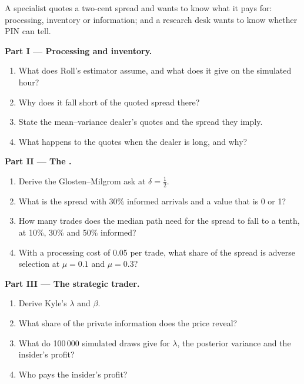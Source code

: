 \begin{problem}\label{pb:mx:why-there-is-a-spread:1}
A specialist quotes a two-cent spread and wants to know what it pays for: processing, inventory or information; and a research desk wants to know whether
PIN can tell.

\medskip\noindent\textbf{Part I --- Processing and inventory.}
\begin{enumerate}
\item What does Roll's estimator assume, and what does it give on the simulated hour?
\item Why does it fall short of the quoted spread there?
\item State the mean--variance dealer's quotes and the spread they imply.
\item What happens to the quotes when the dealer is long, and why?
\end{enumerate}

\medskip\noindent\textbf{Part II --- The .}
\begin{enumerate}[resume]
\item Derive the Glosten--Milgrom ask at $\delta=\tfrac12$.
\item What is the spread with 30\% informed arrivals and a value that is 0 or 1?
\item How many trades does the median path need for the spread to fall to a tenth, at 10\%, 30\% and 50\% informed?
\item With a processing cost of 0.05 per trade, what share of the spread is adverse selection at $\mu=0.1$ and $\mu=0.3$?
\end{enumerate}

\medskip\noindent\textbf{Part III --- The strategic trader.}
\begin{enumerate}[resume]
\item Derive Kyle's $\lambda$ and $\beta$.
\item What share of the private information does the price reveal?
\item What do 100\,000 simulated draws give for $\lambda$, the posterior variance and the insider's profit?
\item Who pays the insider's profit?
\end{enumerate}


\end{problem}
